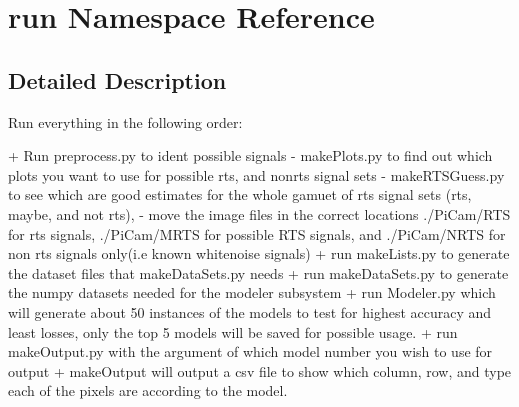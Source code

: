 \section{run Namespace Reference}
\label{namespacerun}


\subsection{Detailed Description}
\begin{DoxyVerb}Run everything in the following order:

+ Run preprocess.py to ident possible signals
    - makePlots.py to find out which plots you want to use for possible rts, and nonrts signal sets
    - makeRTSGuess.py to see which are good estimates for the whole gamuet of rts signal sets (rts, maybe, and not rts),
    - move the image files in the correct locations ./PiCam/RTS for rts signals, ./PiCam/MRTS for possible RTS signals,
      and ./PiCam/NRTS for non rts signals only(i.e known whitenoise signals)
+ run makeLists.py to generate the dataset files that makeDataSets.py needs
+ run makeDataSets.py to generate the numpy datasets needed for the modeler subsystem
+ run Modeler.py which will generate about 50 instances of the models to test for highest accuracy and least losses,
only the top 5 models will be saved for possible usage.
+ run makeOutput.py with the argument of which model number you wish to use for output
+ makeOutput will output a csv file to show which column, row, and type each of the pixels are according to the model.\end{DoxyVerb}
 